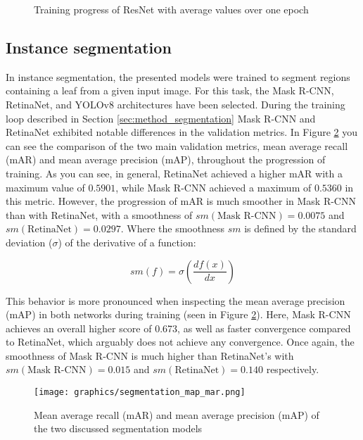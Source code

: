 \documentclass[draft,final]{vutinfth} %
\begin{document}
\begin{appendix}
\begin{figure}
\begin{subfigure}{0.48\textwidth}
    \end{subfigure}
    \caption{Training progress of ResNet with average values over one epoch}
    \label{fig:inception_training}
\end{figure}

\subsection{Instance segmentation} \label{sec:leaf_segmentation_instance_training}

In instance segmentation, the presented models were trained to segment regions containing a leaf from a given input image. For this task, the Mask R-CNN, RetinaNet, and YOLOv8 architectures have been selected.
During the training loop described in Section \ref{sec:method_segmentation} Mask R-CNN and RetinaNet exhibited notable differences in the validation metrics.
In Figure \ref{fig:seg_precision_recall} you can see the comparison of the two main validation metrics, mean average recall (mAR) and mean average precision (mAP), throughout the progression of training. As you can see, in general, RetinaNet achieved a higher mAR with a maximum value of $0.5901$, while Mask R-CNN achieved a maximum of $0.5360$ in this metric. However, the progression of mAR is much smoother in Mask R-CNN than with RetinaNet, with a smoothness of $sm(\text{Mask R-CNN}) = 0.0075$ and $sm(\text{RetinaNet}) = 0.0297$. Where the smoothness $sm$ is defined by the standard deviation ($\sigma$) of the derivative of a function:

\begin{equation} \label{eqn:smoothness}
    sm(f) = \sigma(\frac{df(x)}{dx})
\end{equation}

This behavior is more pronounced when inspecting the mean average precision (mAP) in both networks during training (seen in Figure \ref{fig:seg_precision_recall}). Here, Mask R-CNN achieves an overall higher score of 0.673, as well as faster convergence compared to RetinaNet, which arguably does not achieve any convergence. Once again, the smoothness of Mask R-CNN is much higher than RetinaNet's with $sm(\text{Mask R-CNN}) = 0.015$ and $sm(\text{RetinaNet}) = 0.140$ respectively.

\begin{figure}
    \centering
    \texttt{[image: graphics/segmentation\_map\_mar.png]}
    \caption{Mean average recall (mAR) and mean average precision (mAP) of the two discussed segmentation models}
    \label{fig:seg_precision_recall}
\end{figure}


\end{appendix}
\end{document}
